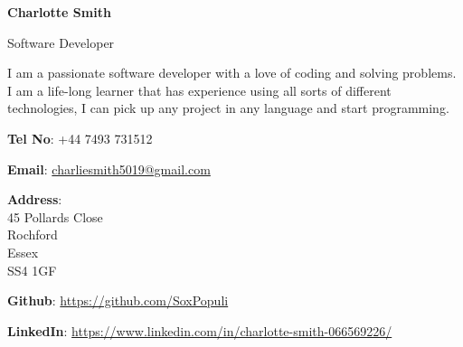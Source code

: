 \documentclass[11pt, twoside, a4paper]{article}
\newlength{\cvMargin}
\newlength{\cvSideWidth}
\begin{document}

\begin{minipage}[t]{\cvSideWidth}
    \begin{center}
        
        {\LARGE \textbf{Charlotte Smith}}
        \vspace*{0.3cm}

        {\Large Software Developer}
        
        \vspace{0.5cm}
        

        \begin{flushleft}
            I am a passionate software developer with a love of coding and solving
            problems. \\
            I am a life-long learner that has experience using all sorts of 
            different technologies, I can pick up any project in any language
            and start programming. \\
        \end{flushleft}
        
        \vspace*{0.5cm}
        \textbf{Tel No}: +44 7493 731512

        \textbf{Email}:
        \href{mailto:charliesmith5019@gmail.com}
        {charliesmith5019@gmail.com}

        \hspace{0.2cm}
            \textbf{Address}: \\
               45 Pollards Close \\
               Rochford \\
               Essex \\
               SS4 1GF \\

        \vspace*{0.5cm}

        \faGithub{}
        \textbf{Github}: 
        \url{https://github.com/SoxPopuli}


        \faLinkedinSquare{}
        \textbf{LinkedIn}:
        \url{https://www.linkedin.com/in/charlotte-smith-066569226/}


\end{center}
\end{minipage}
\end{document}
